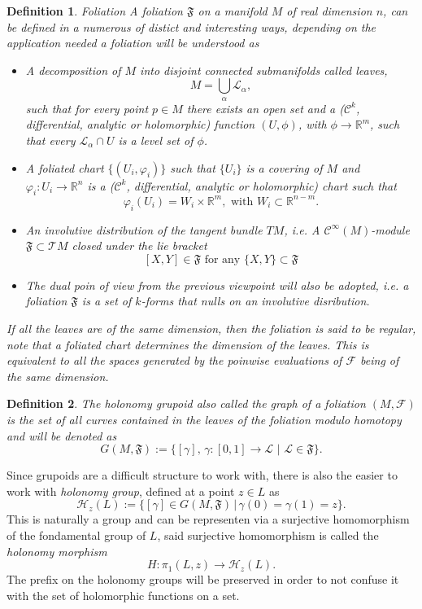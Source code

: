 \documentclass[12pt,twoside,a4paper]{report}
\newtheorem{definition}{Definition}[section]
\newcommand{\re}{\ensuremath{\mathbb R }}
\begin{document}
\begin{definition}{Foliation}
A foliation $\mathfrak{F}$ on a manifold $M$ of real dimension $n$, can be defined in a numerous of distict and interesting ways, depending on the application needed a foliation will be understood as
\begin{itemize}
  \item A decomposition of $M$ into disjoint connected submanifolds called \emph{leaves},
        \[
          M=\bigcup_{\alpha}\mathcal{L_{\alpha}},
        \]
        \noindent such that for every point $p\in M$ there exists an open set and a ($\mathcal{C}^{k}$, differential, analytic or holomorphic) function $(U,\phi)$, with $\phi\rightarrow\re^{m}$, such that every $\mathcal{L}_{\alpha}\cap U$ is a level set of $\phi$.
  \item A \emph{foliated chart} $\{(U_{i},\varphi_{i})\}$ such that $\{U_{i}\}$ is a covering of $M$ and $\varphi_{i}:U_{i}\rightarrow\re^{n}$ is a ($\mathcal{C}^{k}$, differential, analytic or holomorphic) chart such that
        \[
          \varphi_{i}(U_{i})=W_{i}\times\re^{m},\text{ with }W_{i}\subset\re^{n-m}.
        \]
      \item An \emph{involutive} distribution of the tangent bundle $TM$, i.e. A $\mathcal{C}^{\infty}(M)$-module $\mathfrak{F}\subset\mathcal{T}M$ closed under the lie bracket
        \[
          [X,Y]\in\mathfrak{F}\text{ for any } \{X,Y\}\subset\mathfrak{F}
        \]
  \item The dual poin of view from the previous viewpoint will also be adopted, i.e. a foliation $\mathfrak{F}$ is a set of $k$-forms that nulls on an involutive disribution.
\end{itemize}

If all the leaves are of the same dimension, then the foliation is said to be \emph{regular}, note that a foliated chart determines the dimension of the leaves. This is equivalent to all the spaces generated by the poinwise evaluations of $\mathcal{F}$ being of the same dimension.
\end{definition}

\begin{definition}
The \emph{holonomy grupoid} also called the \emph{graph} of a foliation $(M,\mathcal{F})$ is the set of all curves contained in the leaves of the foliation \textit{modulo homotopy} and will be denoted as
\[
G(M,\mathfrak{F}):=\{[\gamma],\,\gamma:[0,1]\rightarrow\mathcal{L}\,\,\vert\,\,\mathcal{L}\in\mathfrak{F}\}.
\]
\end{definition}
Since grupoids are a difficult structure to work with, there is also the easier to work with \emph{holonomy group}, defined at a point $z\in L$ as
\[
\mathcal{H}_z(L):=\{[\gamma]\in G(M,\mathfrak{F})\,|\,\gamma(0)=\gamma(1)=z\}.
\]
This is naturally a group and can be representen via a surjective homomorphism of the fondamental group of $L$, said surjective homomorphism is called the \emph{holonomy morphism}
\[
H:\pi_{1}(L,z)\rightarrow\mathcal{H}_z(L).
\]
The prefix on the holonomy groups will be preserved in order to not confuse it with the set of holomorphic functions on a set.
\end{document}
